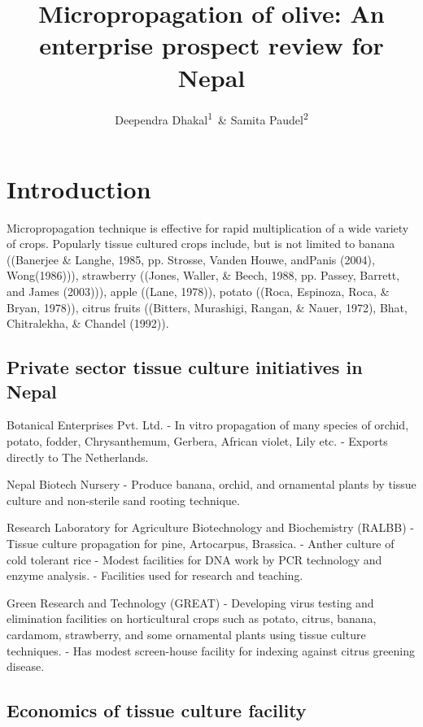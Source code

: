 \documentclass[
  man]{apa6}
\affiliation{
\vspace{0.5cm}
\textsuperscript{1} Gokuleshwor Agriculture and Animal Science College\\\textsuperscript{2} Institute of Agriculture and Animal Science}
\title{Micropropagation of olive: An enterprise prospect review for Nepal}
\author{Deependra Dhakal\textsuperscript{1}~\& Samita Paudel\textsuperscript{2}}
\date{}
\begin{document}
\maketitle

\hypertarget{introduction}{%
\section{Introduction}\label{introduction}}

Micropropagation technique is effective for rapid multiplication of a wide variety of crops. Popularly tissue cultured crops include, but is not limited to banana ((Banerjee \& Langhe, 1985, pp. Strosse, Vanden Houwe, andPanis (2004), Wong(1986))), strawberry ((Jones, Waller, \& Beech, 1988, pp. Passey, Barrett, and James (2003))), apple ((Lane, 1978)), potato ((Roca, Espinoza, Roca, \& Bryan, 1978)), citrus fruits ((Bitters, Murashigi, Rangan, \& Nauer, 1972), Bhat, Chitralekha, \& Chandel (1992)).

\hypertarget{private-sector-tissue-culture-initiatives-in-nepal}{%
\subsection{Private sector tissue culture initiatives in Nepal}\label{private-sector-tissue-culture-initiatives-in-nepal}}

Botanical Enterprises Pvt. Ltd.
- In vitro propagation of many species of orchid, potato, fodder, Chrysanthemum, Gerbera, African violet, Lily etc.
- Exports directly to The Netherlands.

Nepal Biotech Nursery
- Produce banana, orchid, and ornamental plants by tissue culture and non-sterile sand rooting technique.

Research Laboratory for Agriculture Biotechnology and Biochemistry (RALBB)
- Tissue culture propagation for pine, Artocarpus, Brassica.
- Anther culture of cold tolerant rice
- Modest facilities for DNA work by PCR technology and enzyme analysis.
- Facilities used for research and teaching.

Green Research and Technology (GREAT)
- Developing virus testing and elimination facilities on horticultural crops such as potato, citrus, banana, cardamom, strawberry, and some ornamental plants using tissue culture techniques.
- Has modest screen-house facility for indexing against citrus greening disease.

\hypertarget{economics-of-tissue-culture-facility}{%
\subsection{Economics of tissue culture facility}\label{economics-of-tissue-culture-facility}}
\end{document}
